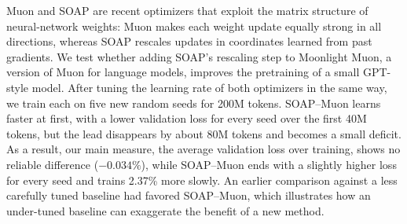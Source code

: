 Muon and SOAP are recent optimizers that exploit the matrix structure of
neural-network weights: Muon makes each weight update equally strong in all
directions, whereas SOAP rescales updates in coordinates learned from past
gradients. We test whether adding SOAP's rescaling step to Moonlight Muon, a
version of Muon for language models, improves the pretraining of a small
GPT-style model. After tuning the learning rate of both optimizers in the same
way, we train each on five new random seeds for 200M tokens. SOAP--Muon learns
faster at first, with a lower validation loss for every seed over the first 40M
tokens, but the lead disappears by about 80M tokens and becomes a small deficit.
As a result, our main measure, the average validation loss over training, shows
no reliable difference ($-0.034\%$), while SOAP--Muon ends with a slightly
higher loss for every seed and trains 2.37\% more slowly. An earlier comparison
against a less carefully tuned baseline had favored SOAP--Muon, which
illustrates how an under-tuned baseline can exaggerate the benefit of a new
method.
